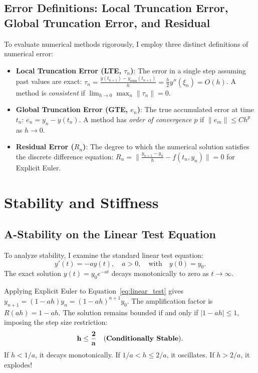 \documentclass[runningheads]{llncs}
\begin{document}
\subsection{Error Definitions: Local Truncation Error, Global Truncation Error, and Residual}
To evaluate numerical methods rigorously, I employ three distinct definitions of numerical error:
\begin{itemize}
    \item \textbf{Local Truncation Error (LTE, $\tau_n$)}: The error in a single step assuming past values are exact: $\tau_n = \frac{y(t_{n+1}) - y_{\text{num}}(t_{n+1})}{h} = \frac{h}{2} y''(\xi_n) = O(h)$. A method is \emph{consistent} if $\lim_{h \to 0} \max_n \|\tau_n\| = 0$.
    \item \textbf{Global Truncation Error (GTE, $e_n$)}: The true accumulated error at time $t_n$: $e_n = y_n - y(t_n)$. A method has \emph{order of convergence $p$} if $\|e_m\| \le C h^p$ as $h \to 0$.
    \item \textbf{Residual Error ($R_n$)}: The degree to which the numerical solution satisfies the discrete difference equation: $R_n = \| \frac{y_{n+1} - y_n}{h} - f(t_n, y_n) \| = 0$ for Explicit Euler.
\end{itemize}

\section{Stability and Stiffness}
\label{sec:stability}
\subsection{A-Stability on the Linear Test Equation}
To analyze stability, I examine the standard linear test equation:
\begin{equation}
\label{eq:linear_test}
y'(t) = -a y(t), \quad a > 0, \quad \text{with} \quad y(0) = y_0.
\end{equation}
The exact solution $y(t) = y_0 e^{-at}$ decays monotonically to zero as $t \to \infty$.

Applying Explicit Euler to Equation~\eqref{eq:linear_test} gives $y_{n+1} = (1 - ah) y_n = (1 - ah)^{n+1} y_0$. The amplification factor is $R(ah) = 1 - ah$. The solution remains bounded if and only if $|1 - ah| \le 1$, imposing the step size restriction:
\begin{equation}
\label{eq:explicit_stability_limit}
\mathbf{h \le \frac{2}{a}} \quad \text{(\textbf{Conditionally Stable})}.
\end{equation}
If $h < 1/a$, it decays monotonically. If $1/a < h \le 2/a$, it oscillates. If $h > 2/a$, it explodes!
\end{document}

